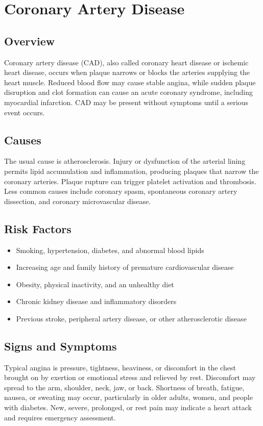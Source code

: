 \chapter{Coronary Artery Disease}
\label{sec:Coronary Artery Disease}

\section{Overview}
Coronary artery disease (CAD), also called coronary heart disease or ischemic heart disease, occurs when plaque narrows or blocks the arteries supplying the heart muscle. Reduced blood flow may cause stable angina, while sudden plaque disruption and clot formation can cause an acute coronary syndrome, including myocardial infarction. CAD may be present without symptoms until a serious event occurs.
\section{Causes}
The usual cause is atherosclerosis. Injury or dysfunction of the arterial lining permits lipid accumulation and inflammation, producing plaques that narrow the coronary arteries. Plaque rupture can trigger platelet activation and thrombosis. Less common causes include coronary spasm, spontaneous coronary artery dissection, and coronary microvascular disease.
\section{Risk Factors}
\begin{itemize}[noitemsep]
  \item Smoking, hypertension, diabetes, and abnormal blood lipids
  \item Increasing age and family history of premature cardiovascular disease
  \item Obesity, physical inactivity, and an unhealthy diet
  \item Chronic kidney disease and inflammatory disorders
  \item Previous stroke, peripheral artery disease, or other atherosclerotic disease
\end{itemize}
\section{Signs and Symptoms}
Typical angina is pressure, tightness, heaviness, or discomfort in the chest brought on by exertion or emotional stress and relieved by rest. Discomfort may spread to the arm, shoulder, neck, jaw, or back. Shortness of breath, fatigue, nausea, or sweating may occur, particularly in older adults, women, and people with diabetes. New, severe, prolonged, or rest pain may indicate a heart attack and requires emergency assessment.
